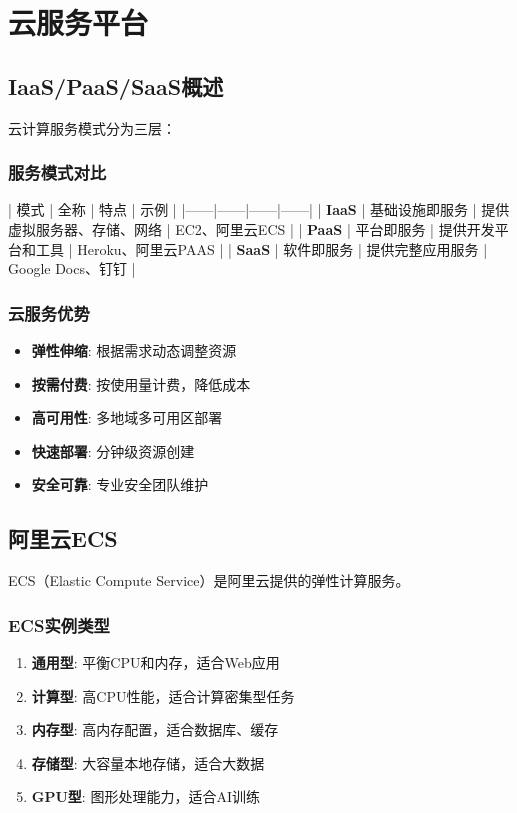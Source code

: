 \documentclass[12pt,UTF8]{ctexbook}
\begin{document}
\chapter{云服务平台}
\label{chap:cloud-platforms}

\section{IaaS/PaaS/SaaS概述}
\label{sec:cloud-models}

云计算服务模式分为三层：

\subsection{服务模式对比}

| 模式 | 全称 | 特点 | 示例 |
|------|------|------|------|
| \textbf{IaaS} | 基础设施即服务 | 提供虚拟服务器、存储、网络 | EC2、阿里云ECS |
| \textbf{PaaS} | 平台即服务 | 提供开发平台和工具 | Heroku、阿里云PAAS |
| \textbf{SaaS} | 软件即服务 | 提供完整应用服务 | Google Docs、钉钉 |

\subsection{云服务优势}

\begin{itemize}
    \item \textbf{弹性伸缩}: 根据需求动态调整资源
    \item \textbf{按需付费}: 按使用量计费，降低成本
    \item \textbf{高可用性}: 多地域多可用区部署
    \item \textbf{快速部署}: 分钟级资源创建
    \item \textbf{安全可靠}: 专业安全团队维护
\end{itemize}

\section{阿里云ECS}
\label{sec:aliyun-ecs}

ECS（Elastic Compute Service）是阿里云提供的弹性计算服务。

\subsection{ECS实例类型}

\begin{enumerate}
    \item \textbf{通用型}: 平衡CPU和内存，适合Web应用
    \item \textbf{计算型}: 高CPU性能，适合计算密集型任务
    \item \textbf{内存型}: 高内存配置，适合数据库、缓存
    \item \textbf{存储型}: 大容量本地存储，适合大数据
    \item \textbf{GPU型}: 图形处理能力，适合AI训练
\end{enumerate}
\end{document}
